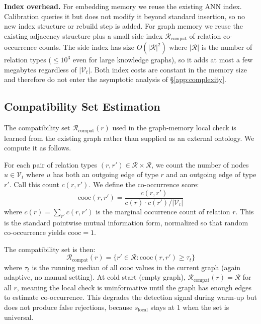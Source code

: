 \textbf{Index overhead.}
For embedding memory we reuse the existing ANN index. Calibration
queries it but does not modify it beyond standard insertion, so no
new index structure or rebuild step is added. For graph memory we
reuse the existing adjacency structure plus a small side index
$\mathcal{R}_{\text{compat}}$ of relation co-occurrence counts. The
side index has size $O(|\mathcal{R}|^2)$ where $|\mathcal{R}|$ is the
number of relation types ($\leq 10^3$ even for large knowledge
graphs), so it adds at most a few megabytes regardless of
$|\mathcal{V}_t|$. Both index costs are constant in the memory size
and therefore do not enter the asymptotic analysis of
\S\ref{app:complexity}.

\subsection{Compatibility Set Estimation}
\label{app:compat_estimation}

The compatibility set $\mathcal{R}_{\text{compat}}(r)$ used in the
graph-memory local check is learned from the existing graph rather
than supplied as an external ontology. We compute it as follows.

For each pair of relation types $(r, r') \in \mathcal{R} \times
\mathcal{R}$, we count the number of nodes $u \in \mathcal{V}_t$
where $u$ has both an outgoing edge of type $r$ and an outgoing edge
of type $r'$. Call this count $c(r, r')$. We define the
co-occurrence score:
\begin{equation}
    \text{cooc}(r, r') = \frac{c(r, r')}{c(r) \cdot c(r') /
    |\mathcal{V}_t|}
\end{equation}
where $c(r) = \sum_{r'} c(r, r')$ is the marginal occurrence count
of relation $r$. This is the standard pointwise mutual information
form, normalized so that random co-occurrence yields
$\text{cooc} = 1$.

The compatibility set is then:
\begin{equation}
    \mathcal{R}_{\text{compat}}(r) = \{r' \in \mathcal{R} :
    \text{cooc}(r, r') \geq \tau_t\}
\end{equation}
where $\tau_t$ is the running median of all $\text{cooc}$ values in
the current graph (again adaptive, no manual setting). At cold start
(empty graph), $\mathcal{R}_{\text{compat}}(r) = \mathcal{R}$ for all
$r$, meaning the local check is uninformative until the graph has
enough edges to estimate co-occurrence. This degrades the detection
signal during warm-up but does not produce false rejections, because
$s_{\text{local}}$ stays at $1$ when the set is universal.

